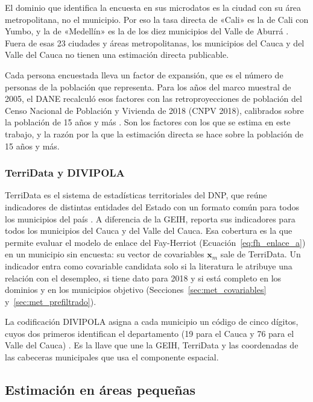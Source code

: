 El dominio que identifica la encuesta en sus microdatos es la ciudad con su área metropolitana, no el municipio. Por eso la tasa directa de «Cali» es la de Cali con Yumbo, y la de «Medellín» es la de los diez municipios del Valle de Aburrá \cite[p.~9]{DANE_GEIH_Metodologia2016}. Fuera de esas 23 ciudades y áreas metropolitanas, los municipios del Cauca y del Valle del Cauca no tienen una estimación directa publicable.

Cada persona encuestada lleva un factor de expansión, que es el número de personas de la población que representa. Para los años del marco muestral de 2005, el DANE recalculó esos factores con las retroproyecciones de población del Censo Nacional de Población y Vivienda de 2018 (CNPV 2018), calibrados sobre la población de 15 años y más \cite[pp.~3, 19]{DANE_GEIH_Series2022}. Son los factores con los que se estima en este trabajo, y la razón por la que la estimación directa se hace sobre la población de 15 años y más.

\subsubsection{TerriData y DIVIPOLA}

TerriData es el sistema de estadísticas territoriales del DNP, que reúne indicadores de distintas entidades del Estado con un formato común para todos los municipios del país \cite{DNP_TerriData}. A diferencia de la GEIH, reporta sus indicadores para todos los municipios del Cauca y del Valle del Cauca. Esa cobertura es la que permite evaluar el modelo de enlace del Fay-Herriot (Ecuación~\ref{eq:fh_enlace_a}) en un municipio sin encuesta: su vector de covariables $\mathbf{x}_m$ sale de TerriData. Un indicador entra como covariable candidata solo si la literatura le atribuye una relación con el desempleo, si tiene dato para 2018 y si está completo en los dominios y en los municipios objetivo (Secciones~\ref{sec:met_covariables} y~\ref{sec:met_prefiltrado}).

La codificación DIVIPOLA asigna a cada municipio un código de cinco dígitos, cuyos dos primeros identifican el departamento (19 para el Cauca y 76 para el Valle del Cauca) \cite{DANE_DIVIPOLA}. Es la llave que une la GEIH, TerriData y las coordenadas de las cabeceras municipales que usa el componente espacial.

\subsection{Estimación en áreas pequeñas}

